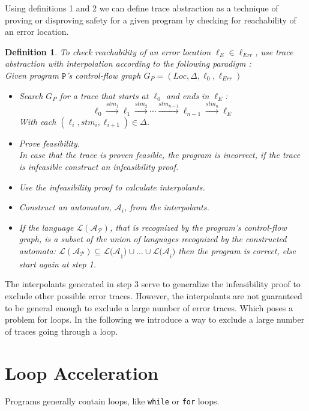 \documentclass{article}
\newtheorem{mydef}{Definition}
\begin{document}
Using definitions 1 and 2 we can define trace abstraction as a technique of proving or disproving safety for a given program by checking for reachability of an error location.

\begin{mydef}
	 To check reachability of an error location $\ell_E \in \ell_{Err}$, use trace abstraction with interpolation according to the following paradigm \cite{10.1007/978-3-642-03237-0_7}: \\
	 Given 	program $\texttt{P}$'s control-flow graph $G_P = (Loc, \Delta, \ell_{0}, \ell_{Err})$
	\begin{itemize}
		\item[1.] Search $G_P$ for a trace that starts at $\ell_0$ and ends in $\ell_E$:
		\begin{equation*}
			\ell_{0} \xrightarrow{\text{$stm_1$}} \ell_1 \xrightarrow{\text{$stm_2$}} \cdots \xrightarrow{\text{$stm_{n-1}$}} \ell_{n-1} \xrightarrow{\text{$stm_{n}$}} \ell_{E}
		\end{equation*}
		With each $(\ell_i, stm_i, \ell_{i + 1}) \in \Delta$.
		\item[2.] Prove feasibility. \\ In case that the trace is proven feasible, the program is incorrect, if the trace is infeasible construct an infeasibility proof.
		\item[3.] Use the infeasibility proof to calculate interpolants.
		\item[4.] Construct an automaton, $\mathcal{A}_i$, from the interpolants.
		\item[5.] If the language $\mathcal{L(A_P)}$, that is recognized by the program's control-flow graph, is a subset of the union of languages recognized by the constructed automata: $\mathcal{L(A_P)} \subseteq \mathcal{L(A}_1) \cup ... \cup \mathcal{L(A}_i)$ then the program is correct, else start again at step 1.
	\end{itemize}
\end{mydef}
	The interpolants generated in step 3 serve to generalize the infeasibility proof to exclude other possible error traces. However, the interpolants are not guaranteed to be general enough to exclude a large number of error traces. Which poses a problem for loops. In the following we introduce a way to exclude a large number of traces going through a loop.


\section{Loop Acceleration}
Programs generally contain loops, like \texttt{while} or \texttt{for} loops. 
\end{document}
